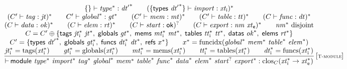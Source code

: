 $$
\begin{array}{@{}c@{}}\displaystyle
\frac{
\begin{array}{@{}c@{}}
\{  \} \vdash {{\mathit{type}}^\ast} : {{\mathit{dt}'}^\ast}
 \qquad
(\{ \mathsf{types}~{{\mathit{dt}'}^\ast} \} \vdash {\mathit{import}} : {\mathit{xt}}_{\mathsf{i}})^\ast
 \\
({C'} \vdash {\mathit{tag}} : {\mathit{jt}})^\ast
 \qquad
{C'} \vdash {{\mathit{global}}^\ast} : {{\mathit{gt}}^\ast}
 \qquad
({C'} \vdash {\mathit{mem}} : {\mathit{mt}})^\ast
 \qquad
({C'} \vdash {\mathit{table}} : {\mathit{tt}})^\ast
 \qquad
(C \vdash {\mathit{func}} : {\mathit{dt}})^\ast
 \\
(C \vdash {\mathit{data}} : {\mathit{ok}})^\ast
 \qquad
(C \vdash {\mathit{elem}} : {\mathit{rt}})^\ast
 \qquad
(C \vdash {\mathit{start}} : \mathsf{ok})^?
 \qquad
(C \vdash {\mathit{export}} : {\mathit{nm}}~{\mathit{xt}}_{\mathsf{e}})^\ast
 \qquad
{{\mathit{nm}}^\ast}~{\mathrm{disjoint}}
 \\
C = {C'} \oplus \{ \mathsf{tags}~{{\mathit{jt}}_{\mathsf{i}}^\ast}~{{\mathit{jt}}^\ast},\;\allowbreak \mathsf{globals}~{{\mathit{gt}}^\ast},\;\allowbreak \mathsf{mems}~{{\mathit{mt}}_{\mathsf{i}}^\ast}~{{\mathit{mt}}^\ast},\;\allowbreak \mathsf{tables}~{{\mathit{tt}}_{\mathsf{i}}^\ast}~{{\mathit{tt}}^\ast},\;\allowbreak \mathsf{datas}~{{\mathit{ok}}^\ast},\;\allowbreak \mathsf{elems}~{{\mathit{rt}}^\ast} \}
 \\
{C'} = \{ \mathsf{types}~{{\mathit{dt}'}^\ast},\;\allowbreak \mathsf{globals}~{{\mathit{gt}}_{\mathsf{i}}^\ast},\;\allowbreak \mathsf{funcs}~{{\mathit{dt}}_{\mathsf{i}}^\ast}~{{\mathit{dt}}^\ast},\;\allowbreak \mathsf{refs}~{x^\ast} \}
 \qquad
{x^\ast} = {\mathrm{funcidx}}({{\mathit{global}}^\ast}~{{\mathit{mem}}^\ast}~{{\mathit{table}}^\ast}~{{\mathit{elem}}^\ast})
 \\
{{\mathit{jt}}_{\mathsf{i}}^\ast} = {\mathrm{tags}}({{\mathit{xt}}_{\mathsf{i}}^\ast})
 \qquad
{{\mathit{gt}}_{\mathsf{i}}^\ast} = {\mathrm{globals}}({{\mathit{xt}}_{\mathsf{i}}^\ast})
 \qquad
{{\mathit{mt}}_{\mathsf{i}}^\ast} = {\mathrm{mems}}({{\mathit{xt}}_{\mathsf{i}}^\ast})
 \qquad
{{\mathit{tt}}_{\mathsf{i}}^\ast} = {\mathrm{tables}}({{\mathit{xt}}_{\mathsf{i}}^\ast})
 \qquad
{{\mathit{dt}}_{\mathsf{i}}^\ast} = {\mathrm{funcs}}({{\mathit{xt}}_{\mathsf{i}}^\ast})
\end{array}
}{
{\vdash}\, \mathsf{module}~{{\mathit{type}}^\ast}~{{\mathit{import}}^\ast}~{{\mathit{tag}}^\ast}~{{\mathit{global}}^\ast}~{{\mathit{mem}}^\ast}~{{\mathit{table}}^\ast}~{{\mathit{func}}^\ast}~{{\mathit{data}}^\ast}~{{\mathit{elem}}^\ast}~{{\mathit{start}}^?}~{{\mathit{export}}^\ast} : {{\mathrm{clos}}}_{C}({{\mathit{xt}}_{\mathsf{i}}^\ast} \rightarrow {{\mathit{xt}}_{\mathsf{e}}^\ast})
} \, {[\textsc{\scriptsize T{-}module}]}
\qquad
\end{array}
$$

